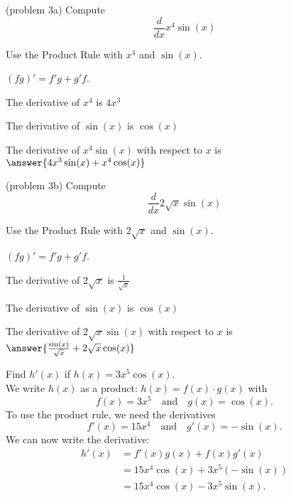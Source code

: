 \documentclass[handout]{ximera}
\begin{document}
\begin{problem}(problem 3a)
  Compute
  \[
  \frac{d}{dx} x^4\sin(x)
  \]
  
    \begin{hint}
      Use the Product Rule with $x^4$ and $\sin(x)$.
    \end{hint}
    \begin{hint}
      $(fg)' = f'g+g'f$.
    \end{hint}
    \begin{hint}
      The derivative of $x^4$ is $4x^3$
    \end{hint}
    \begin{hint}
      The derivative of $\sin(x)$ is $\cos(x)$
    \end{hint}
    
		The derivative of $x^4\sin(x)$ with respect to $x$ is
		 $\answer{4x^3\sin(x) + x^4\cos(x)}$
		
\end{problem}


\begin{problem}(problem 3b)
  Compute
  \[
  \frac{d}{dx} 2\sqrt x\sin(x)
  \]
  
    \begin{hint}
      Use the Product Rule with $2\sqrt x$ and $\sin(x)$.
    \end{hint}
    \begin{hint}
      $(fg)' = f'g+g'f$.
    \end{hint}
    \begin{hint}
      The derivative of $2\sqrt x$ is $\frac{1}{\sqrt x}$
    \end{hint}
    \begin{hint}
      The derivative of $\sin(x)$ is $\cos(x)$
    \end{hint}
    
		The derivative of $2\sqrt x\sin(x)$ with respect to $x$ is
		 $\answer{\frac{\sin(x)}{\sqrt x} + 2\sqrt x\cos(x)}$
		
\end{problem}


\begin{example}[example 4]
Find $h'(x)$ if $h(x) = 3x^5\cos(x)$.\\
We write $h(x)$ as a product: $h(x) = f(x)\cdot g(x)$ with
 \[f(x) = 3x^5 \quad \text{and} \quad g(x) = \cos(x).\] 
To use the product rule, we need the derivatives
\[f'(x) = 15x^4 \quad \text{and} \quad g'(x) = -\sin(x).\] 
We can now write the derivative:
\begin{align*}
h'(x) &= f'(x)g(x) + f(x)g'(x)\\
&=  15x^4 \cos(x) +3x^5(-\sin(x)) \\
&= 15x^4 \cos(x) - 3x^5\sin(x).
\end{align*}
\end{example}
\end{document}

